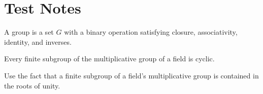 \documentclass[12pt]{article}
\begin{document}
\section*{Test Notes}

\begin{definitionBox}
A group is a set $G$ with a binary operation satisfying closure, associativity, identity, and inverses.
\end{definitionBox}

\begin{theoremBox}
Every finite subgroup of the multiplicative group of a field is cyclic.
\end{theoremBox}

\begin{proofBox}
[Sketch] Use the fact that a finite subgroup of a field’s multiplicative group is contained in the roots of unity.
\end{proofBox}
\end{document}
